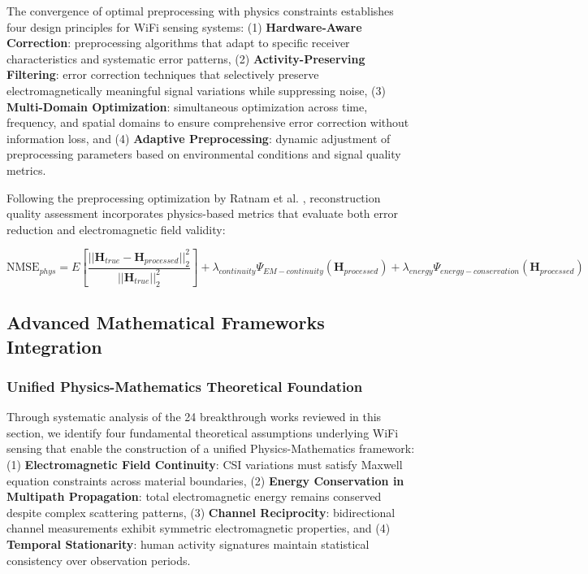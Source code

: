 \documentclass[journal]{IEEEtran}
\begin{document}
The convergence of optimal preprocessing with physics constraints establishes four design principles for WiFi sensing systems: (1) \textbf{Hardware-Aware Correction}: preprocessing algorithms that adapt to specific receiver characteristics and systematic error patterns, (2) \textbf{Activity-Preserving Filtering}: error correction techniques that selectively preserve electromagnetically meaningful signal variations while suppressing noise, (3) \textbf{Multi-Domain Optimization}: simultaneous optimization across time, frequency, and spatial domains to ensure comprehensive error correction without information loss, and (4) \textbf{Adaptive Preprocessing}: dynamic adjustment of preprocessing parameters based on environmental conditions and signal quality metrics.

Following the preprocessing optimization by Ratnam et al. \cite{ratnam2024optimal}, reconstruction quality assessment incorporates physics-based metrics that evaluate both error reduction and electromagnetic field validity:

\begin{equation}
\text{NMSE}_{phys} = E\left[\frac{||\mathbf{H}_{true} - \mathbf{H}_{processed}||_2^2}{||\mathbf{H}_{true}||_2^2}\right] + \lambda_{continuity} \Psi_{EM-continuity}(\mathbf{H}_{processed}) + \lambda_{energy} \Psi_{energy-conservation}(\mathbf{H}_{processed})
\label{eq:nmse_physics}
\end{equation}

\subsection{Advanced Mathematical Frameworks Integration}

\subsubsection{Unified Physics-Mathematics Theoretical Foundation}

Through systematic analysis of the 24 breakthrough works reviewed in this section, we identify four fundamental theoretical assumptions underlying WiFi sensing that enable the construction of a unified Physics-Mathematics framework: (1) \textbf{Electromagnetic Field Continuity}: CSI variations must satisfy Maxwell equation constraints across material boundaries, (2) \textbf{Energy Conservation in Multipath Propagation}: total electromagnetic energy remains conserved despite complex scattering patterns, (3) \textbf{Channel Reciprocity}: bidirectional channel measurements exhibit symmetric electromagnetic properties, and (4) \textbf{Temporal Stationarity}: human activity signatures maintain statistical consistency over observation periods.
\end{document}
